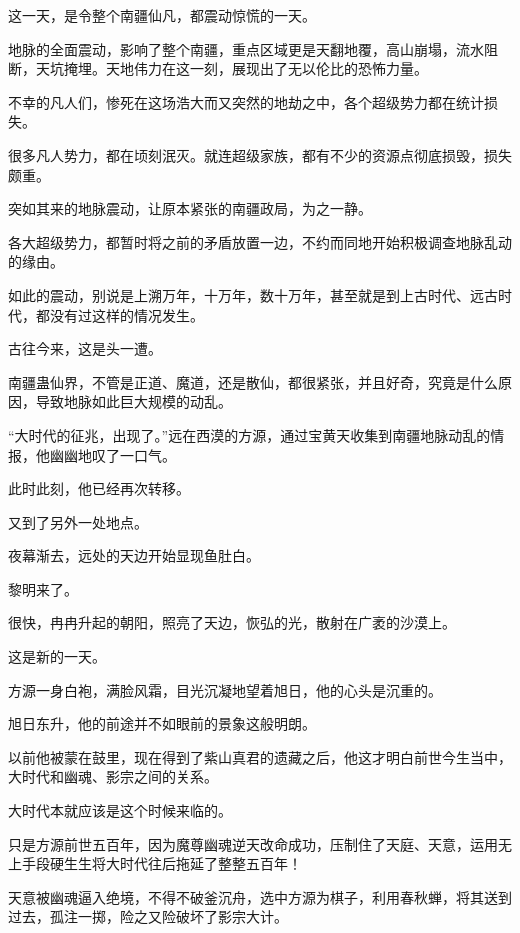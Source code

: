 
\begin{this_body}



这一天，是令整个南疆仙凡，都震动惊慌的一天。

地脉的全面震动，影响了整个南疆，重点区域更是天翻地覆，高山崩塌，流水阻断，天坑掩埋。天地伟力在这一刻，展现出了无以伦比的恐怖力量。

不幸的凡人们，惨死在这场浩大而又突然的地劫之中，各个超级势力都在统计损失。

很多凡人势力，都在顷刻泯灭。就连超级家族，都有不少的资源点彻底损毁，损失颇重。

突如其来的地脉震动，让原本紧张的南疆政局，为之一静。

各大超级势力，都暂时将之前的矛盾放置一边，不约而同地开始积极调查地脉乱动的缘由。

如此的震动，别说是上溯万年，十万年，数十万年，甚至就是到上古时代、远古时代，都没有过这样的情况发生。

古往今来，这是头一遭。

南疆蛊仙界，不管是正道、魔道，还是散仙，都很紧张，并且好奇，究竟是什么原因，导致地脉如此巨大规模的动乱。

“大时代的征兆，出现了。”远在西漠的方源，通过宝黄天收集到南疆地脉动乱的情报，他幽幽地叹了一口气。

此时此刻，他已经再次转移。

又到了另外一处地点。

夜幕渐去，远处的天边开始显现鱼肚白。

黎明来了。

很快，冉冉升起的朝阳，照亮了天边，恢弘的光，散射在广袤的沙漠上。

这是新的一天。

方源一身白袍，满脸风霜，目光沉凝地望着旭日，他的心头是沉重的。

旭日东升，他的前途并不如眼前的景象这般明朗。

以前他被蒙在鼓里，现在得到了紫山真君的遗藏之后，他这才明白前世今生当中，大时代和幽魂、影宗之间的关系。

大时代本就应该是这个时候来临的。

只是方源前世五百年，因为魔尊幽魂逆天改命成功，压制住了天庭、天意，运用无上手段硬生生将大时代往后拖延了整整五百年！

天意被幽魂逼入绝境，不得不破釜沉舟，选中方源为棋子，利用春秋蝉，将其送到过去，孤注一掷，险之又险破坏了影宗大计。


\end{this_body}
